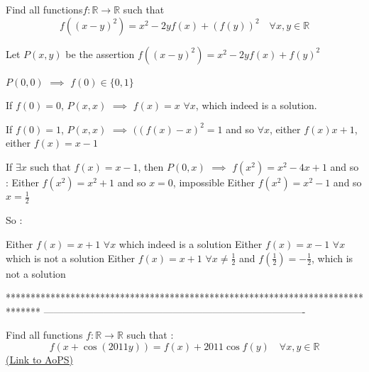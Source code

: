\begin{solution}
	\begin{tcolorbox}Find all functions$ f:\mathbb R\to\mathbb R$ such that
\[f((x - y)^2) = x^2 - 2yf(x) + (f(y))^2 \quad \forall x,y\in\mathbb R\]\end{tcolorbox}
Let $P(x,y)$ be the assertion $f((x-y)^2)=x^2-2yf(x)+f(y)^2$

$P(0,0)$ $\implies$ $f(0)\in\{0,1\}$

If $f(0)=0$, $P(x,x)$ $\implies$ $\boxed{f(x)=x}$ $\forall x$, which indeed is a solution.

If $f(0)=1$, $P(x,x)$ $\implies$ $((f(x)-x)^2=1$ and so $\forall x$, either $f(x)x+1$, either $f(x)=x-1$

If $\exists x$ such that $f(x)=x-1$, then $P(0,x)$ $\implies$ $f(x^2)=x^2-4x+1$ and so :
Either $f(x^2)=x^2+1$ and so $x=0$, impossible
Either $f(x^2)=x^2-1$ and so $x=\frac 12$

So :

Either $\boxed{f(x)=x+1}$ $\forall x$ which indeed is a solution
Either $f(x)=x-1$ $\forall x$ which is not a solution
Either $f(x)=x+1$ $\forall x\ne \frac 12$ and $f(\frac 12)=-\frac 12$, which is not a solution
\end{solution}
*******************************************************************************
-------------------------------------------------------------------------------

\begin{problem}
	Find all functions $f:\mathbb{R} \to \mathbb{R}$ such that :
\[f\left( {x + \cos (2011y)} \right) = f(x) + 2011\cos f(y)\quad \forall x,y \in \mathbb{R}\]
	\flushright \href{https://artofproblemsolving.com/community/c6h566446}{(Link to AoPS)}
\end{problem}



